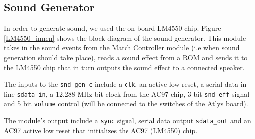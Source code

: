 	  \subsection{Sound Generator}
				In order to generate sound, we used the on board LM4550 chip. Figure \ref{LM4550_innen} shows the block diagram of the sound generator. This module takes in the sound events from the Match Controller module (i.e when sound generation should take place), reads a sound effect from a ROM and sends it to the LM4550 chip that in turn outputs the sound effect to a connected speaker.
				
				The inputs to the \texttt{snd\_gen\_c} include a \texttt{clk}, an active low reset, a serial data in line \texttt{sdata\_in}, a 12.288 MHz bit clock from the AC97 chip, 3 bit \texttt{snd\_eff} signal and 5 bit \texttt{volume} control (will be connected to the switches of the Atlys board).
				
				The module's output include a \texttt{sync} signal, serial data output \texttt{sdata\_out} and an AC97 active low reset that initializes the AC97 (LM4550) chip. 
				
